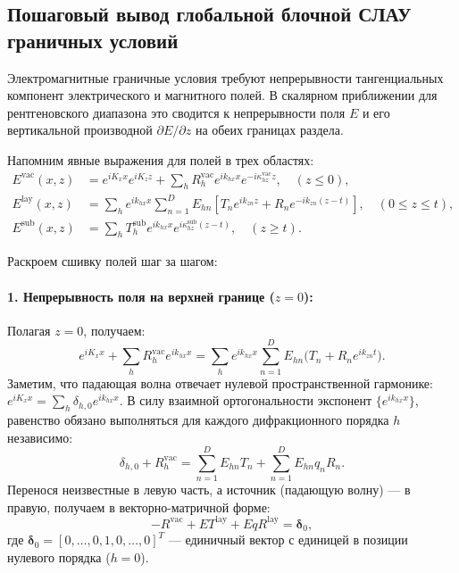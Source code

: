 \documentclass[a4paper,11pt]{article}
\begin{document}
\subsection{Пошаговый вывод глобальной блочной СЛАУ граничных условий}

Электромагнитные граничные условия требуют непрерывности тангенциальных компонент электрического и магнитного полей. В скалярном приближении для рентгеновского диапазона это сводится к непрерывности поля $E$ и его вертикальной производной $\partial E / \partial z$ на обеих границах раздела.

Напомним явные выражения для полей в трех областях:
\begin{align}
    E^{\text{vac}}(x, z) &= e^{i K_x x} e^{i K_z z} + \sum_h R_h^{\text{vac}} e^{i k_{hx} x} e^{-i \kappa_{hz}^{\text{vac}} z}, \quad (z \le 0), \\
    E^{\text{lay}}(x, z) &= \sum_h e^{i k_{hx} x} \sum_{n=1}^D E_{hn} \left[ T_n e^{i k_{zn} z} + R_n e^{-i k_{zn}(z - t)} \right], \quad (0 \le z \le t), \\
    E^{\text{sub}}(x, z) &= \sum_h T_h^{\text{sub}} e^{i k_{hx} x} e^{i \kappa_{hz}^{\text{sub}} (z - t)}, \quad (z \ge t).
\end{align}

Раскроем сшивку полей шаг за шагом:

\paragraph{1. Непрерывность поля на верхней границе ($z = 0$):}
Полагая $z = 0$, получаем:
\begin{equation}
    e^{i K_x x} + \sum_h R_h^{\text{vac}} e^{i k_{hx} x} = \sum_h e^{i k_{hx} x} \sum_{n=1}^D E_{hn} \big( T_n + R_n e^{i k_{zn} t} \big).
\end{equation}
Заметим, что падающая волна отвечает нулевой пространственной гармонике: $e^{i K_x x} = \sum_h \delta_{h, 0} e^{i k_{hx} x}$. 
В силу взаимной ортогональности экспонент $\{e^{i k_{hx} x}\}$, равенство обязано выполняться для каждого дифракционного порядка $h$ независимо:
\begin{equation}
    \delta_{h, 0} + R_h^{\text{vac}} = \sum_{n=1}^D E_{hn} T_n + \sum_{n=1}^D E_{hn} q_n R_n.
\end{equation}
Перенося неизвестные в левую часть, а источник (падающую волну) — в правую, получаем в векторно-матричной форме:
\begin{equation}
    - R^{\text{vac}} + E T^{\text{lay}} + E q R^{\text{lay}} = \boldsymbol{\delta}_0,
    \label{eq:bc_row1}
\end{equation}
где $\boldsymbol{\delta}_0 = [0, \dots, 0, 1, 0, \dots, 0]^T$ — единичный вектор с единицей в позиции нулевого порядка ($h = 0$).
\end{document}
